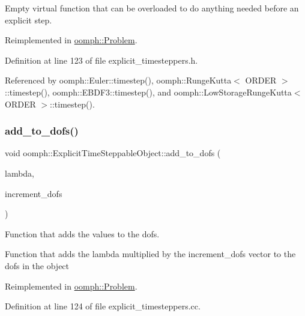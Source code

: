 Empty virtual function that can be overloaded to do anything needed before an explicit step. 



Reimplemented in \hyperlink{classoomph_1_1Problem_a6ae06bc0ecba349ebdf76220c1a17546}{oomph\+::\+Problem}.



Definition at line 123 of file explicit\+\_\+timesteppers.\+h.



Referenced by oomph\+::\+Euler\+::timestep(), oomph\+::\+Runge\+Kutta$<$ O\+R\+D\+E\+R $>$\+::timestep(), oomph\+::\+E\+B\+D\+F3\+::timestep(), and oomph\+::\+Low\+Storage\+Runge\+Kutta$<$ O\+R\+D\+E\+R $>$\+::timestep().

\mbox{\label{classoomph_1_1ExplicitTimeSteppableObject_a00f10d9ad6de867dd72ba175a5f0ec89}} 
\subsubsection{\texorpdfstring{add\+\_\+to\+\_\+dofs()}{add\_to\_dofs()}}
{\footnotesize\ttfamily void oomph\+::\+Explicit\+Time\+Steppable\+Object\+::add\+\_\+to\+\_\+dofs (\begin{DoxyParamCaption}\item[{const double \&}]{lambda,  }\item[{const \hyperlink{classoomph_1_1DoubleVector}{Double\+Vector} \&}]{increment\+\_\+dofs }\end{DoxyParamCaption})\hspace{0.3cm}{\ttfamily [virtual]}}



Function that adds the values to the dofs. 

Function that adds the lambda multiplied by the increment\+\_\+dofs vector to the dofs in the object 

Reimplemented in \hyperlink{classoomph_1_1Problem_a352210408b3eed3e7a834b8b9a33a99a}{oomph\+::\+Problem}.



Definition at line 124 of file explicit\+\_\+timesteppers.\+cc.



